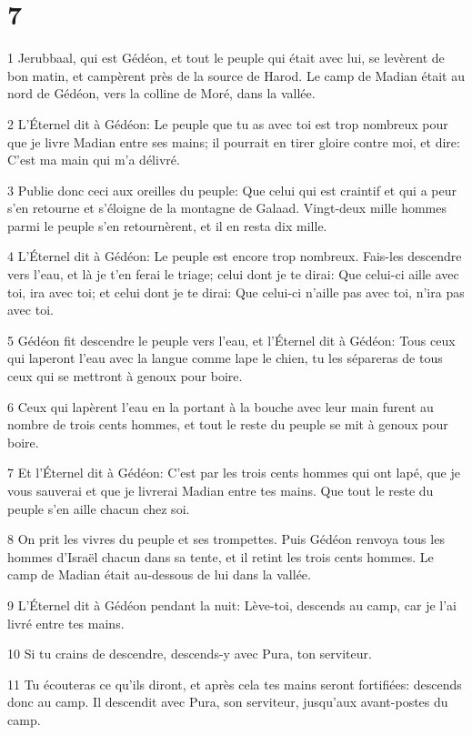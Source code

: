 \chapter{7}

\par 1 Jerubbaal, qui est Gédéon, et tout le peuple qui était avec lui, se levèrent de bon matin, et campèrent près de la source de Harod. Le camp de Madian était au nord de Gédéon, vers la colline de Moré, dans la vallée.
\par 2 L'Éternel dit à Gédéon: Le peuple que tu as avec toi est trop nombreux pour que je livre Madian entre ses mains; il pourrait en tirer gloire contre moi, et dire: C'est ma main qui m'a délivré.
\par 3 Publie donc ceci aux oreilles du peuple: Que celui qui est craintif et qui a peur s'en retourne et s'éloigne de la montagne de Galaad. Vingt-deux mille hommes parmi le peuple s'en retournèrent, et il en resta dix mille.
\par 4 L'Éternel dit à Gédéon: Le peuple est encore trop nombreux. Fais-les descendre vers l'eau, et là je t'en ferai le triage; celui dont je te dirai: Que celui-ci aille avec toi, ira avec toi; et celui dont je te dirai: Que celui-ci n'aille pas avec toi, n'ira pas avec toi.
\par 5 Gédéon fit descendre le peuple vers l'eau, et l'Éternel dit à Gédéon: Tous ceux qui laperont l'eau avec la langue comme lape le chien, tu les sépareras de tous ceux qui se mettront à genoux pour boire.
\par 6 Ceux qui lapèrent l'eau en la portant à la bouche avec leur main furent au nombre de trois cents hommes, et tout le reste du peuple se mit à genoux pour boire.
\par 7 Et l'Éternel dit à Gédéon: C'est par les trois cents hommes qui ont lapé, que je vous sauverai et que je livrerai Madian entre tes mains. Que tout le reste du peuple s'en aille chacun chez soi.
\par 8 On prit les vivres du peuple et ses trompettes. Puis Gédéon renvoya tous les hommes d'Israël chacun dans sa tente, et il retint les trois cents hommes. Le camp de Madian était au-dessous de lui dans la vallée.
\par 9 L'Éternel dit à Gédéon pendant la nuit: Lève-toi, descends au camp, car je l'ai livré entre tes mains.
\par 10 Si tu crains de descendre, descends-y avec Pura, ton serviteur.
\par 11 Tu écouteras ce qu'ils diront, et après cela tes mains seront fortifiées: descends donc au camp. Il descendit avec Pura, son serviteur, jusqu'aux avant-postes du camp.
